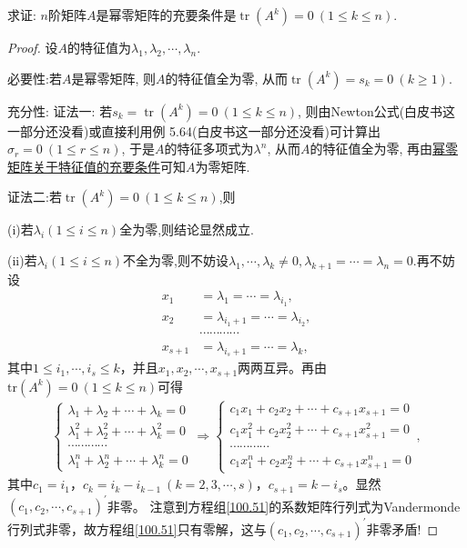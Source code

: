 \documentclass[../../main.tex]{subfiles}
\begin{document}
\begin{proposition}[幂零矩阵关于迹的充要条件]\label{proposition:幂零矩阵关于迹的充要条件}
求证: $n$阶矩阵$A$是幂零矩阵的充要条件是$\operatorname{tr}(A^k) = 0 \ (1 \leq k \leq n)$.
\end{proposition}
\begin{proof}
设$A$的特征值为$\lambda_1, \lambda_2, \cdots, \lambda_n$. 

{\heiti 必要性:}若$A$是幂零矩阵, 则$A$的特征值全为零, 从而$\operatorname{tr}(A^k) = s_k = 0 \ (k \geq 1)$. 

{\heiti 充分性:}
{\color{blue}证法一:}
若$s_k = \operatorname{tr}(A^k) = 0 \ (1 \leq k \leq n)$, 则由Newton公式(白皮书这一部分还没看)或直接利用例 5.64(白皮书这一部分还没看)可计算出$\sigma_r = 0 \ (1 \leq r \leq n)$, 于是$A$的特征多项式为$\lambda^n$, 从而$A$的特征值全为零, 再由\hyperref[proposition:幂零矩阵关于特征值的充要条件]{幂零矩阵关于特征值的充要条件}可知$A$为零矩阵.

{\color{blue}证法二:}若$\operatorname{tr}(A^k) = 0 \ (1 \leq k \leq n)$,则

(i)若$\lambda_i(1\leq i\leq n)$全为零,则结论显然成立.

(ii)若$\lambda_i(1\leq i\leq n)$不全为零,则不妨设$\lambda_1,\cdots,\lambda_k\ne 0,\lambda_{k+1}=\cdots=\lambda_n=0$.再不妨设
\begin{align*}
x_1&=\lambda _1=\cdots =\lambda _{i_1},\\
x_2&=\lambda _{i_1+1}=\cdots =\lambda _{i_2},\\
&\cdots \cdots \cdots \cdots \\
x_{s + 1}&=\lambda _{i_s+1}=\cdots =\lambda _k,
\end{align*}
其中$1\leq i_1,\cdots,i_s\leq k$，并且$x_1,x_2,\cdots,x_{s + 1}$两两互异。再由$\mathrm{tr}(A^k)=0\ (1\leq k\leq n)$可得
\begin{align}
\begin{cases}
\lambda _1+\lambda _2+\cdots +\lambda _k=0\\
\lambda _{1}^{2}+\lambda _{2}^{2}+\cdots +\lambda _{k}^{2}=0\\
\cdots \cdots \cdots \cdots\\
\lambda _{1}^{n}+\lambda _{2}^{n}+\cdots +\lambda _{k}^{n}=0
\end{cases}\Rightarrow 
\begin{cases}
c_1x_1+c_2x_2+\cdots +c_{s + 1}x_{s + 1}=0\\
c_1x_{1}^{2}+c_2x_{2}^{2}+\cdots +c_{s + 1}x_{s + 1}^{2}=0\\
\cdots \cdots \cdots \cdots\\
c_1x_{1}^{n}+c_2x_{2}^{n}+\cdots +c_{s + 1}x_{s + 1}^{n}=0
\end{cases}, \label{100.51}
\end{align}
其中$c_1 = i_1$，$c_k = i_k - i_{k - 1}\ (k = 2,3,\cdots,s)$，$c_{s + 1} = k - i_s$。显然$(c_1,c_2,\cdots,c_{s + 1})^\prime$非零。
注意到方程组\eqref{100.51}的系数矩阵行列式为Vandermonde行列式非零，故方程组\eqref{100.51}只有零解，这与$(c_1,c_2,\cdots,c_{s + 1})^\prime$非零矛盾! 
\end{proof}
\end{document}
